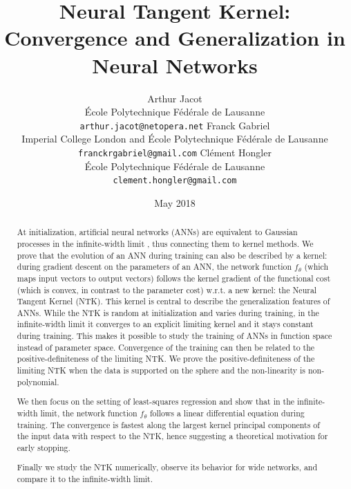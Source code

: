 \documentclass{article}
\begin{document}
\title{Neural Tangent Kernel: \\ Convergence and Generalization in Neural Networks}
\author{Arthur Jacot \\ École Polytechnique Fédérale de Lausanne \\ 
\texttt{arthur.jacot@netopera.net}
\And
Franck Gabriel \\ Imperial College London and École Polytechnique Fédérale de Lausanne \\ \texttt{franckrgabriel@gmail.com}
\And
Cl\'ement Hongler \\ École Polytechnique Fédérale de Lausanne \\ \texttt{clement.hongler@gmail.com}
}
\date{May 2018}


\maketitle

\begin{abstract}
At initialization, artificial neural networks (ANNs) are equivalent to Gaussian processes in the infinite-width limit \cite{Neal1996,Daniely, Matthews2017GaussianProcess,Lee2017,Matthews2018GaussianProcess}, thus connecting them to kernel methods. We prove that the evolution of an ANN during training can also be described by a kernel: during gradient descent on the parameters of an ANN, the network function $f_\theta$ (which maps input vectors to output vectors) follows the kernel gradient of the functional cost (which is convex, in contrast to the parameter cost) w.r.t. a new kernel: the Neural Tangent Kernel (NTK). This kernel is central to describe the generalization features of ANNs. While the NTK is random at initialization and varies during training, in the infinite-width limit it converges to an explicit limiting kernel and it stays constant during training. This makes it possible to study the training of ANNs in function space instead of parameter space. Convergence of the training can then be related to the positive-definiteness of the limiting NTK. We prove the positive-definiteness of the limiting NTK when the data is supported on the sphere and the non-linearity is non-polynomial.

We then focus on the setting of least-squares regression and show that in the infinite-width limit, the network function $f_\theta$ follows a linear differential equation during training. The convergence is fastest along the largest kernel principal components of the input data with respect to the NTK, hence suggesting a theoretical motivation for early stopping.

Finally we study the NTK numerically, observe its behavior for wide networks, and compare it to the infinite-width limit.
\end{abstract}
\end{document}
